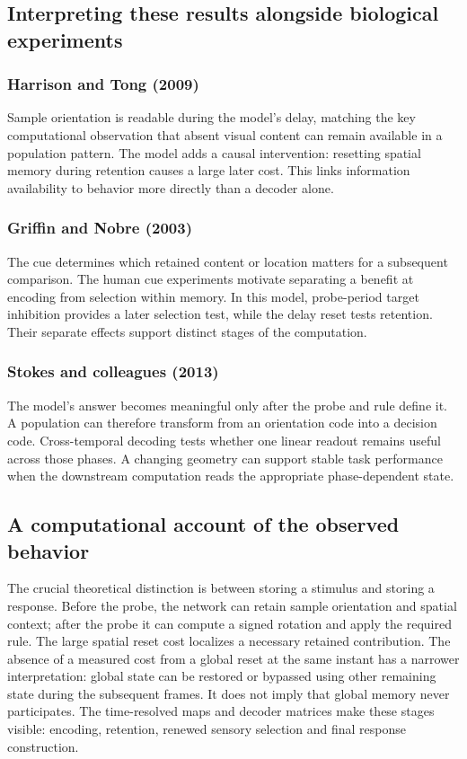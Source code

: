 \documentclass[11pt]{article}
\begin{document}
\subsection{Interpreting these results alongside biological experiments}
\subsubsection{Harrison and Tong (2009)}
Sample orientation is readable during the model’s delay, matching the key computational observation that absent visual content can remain available in a population pattern. The model adds a causal intervention: resetting spatial memory during retention causes a large later cost. This links information availability to behavior more directly than a decoder alone. \cite{bio_harrison}

\subsubsection{Griffin and Nobre (2003)}
The cue determines which retained content or location matters for a subsequent comparison. The human cue experiments motivate separating a benefit at encoding from selection within memory. In this model, probe-period target inhibition provides a later selection test, while the delay reset tests retention. Their separate effects support distinct stages of the computation. \cite{bio_griffin}

\subsubsection{Stokes and colleagues (2013)}
The model’s answer becomes meaningful only after the probe and rule define it. A population can therefore transform from an orientation code into a decision code. Cross-temporal decoding tests whether one linear readout remains useful across those phases. A changing geometry can support stable task performance when the downstream computation reads the appropriate phase-dependent state. \cite{bio_stokes}

\subsection{A computational account of the observed behavior}
The crucial theoretical distinction is between storing a stimulus and storing a response. Before the probe, the network can retain sample orientation and spatial context; after the probe it can compute a signed rotation and apply the required rule. The large spatial reset cost localizes a necessary retained contribution. The absence of a measured cost from a global reset at the same instant has a narrower interpretation: global state can be restored or bypassed using other remaining state during the subsequent frames. It does not imply that global memory never participates. The time-resolved maps and decoder matrices make these stages visible: encoding, retention, renewed sensory selection and final response construction.
\end{document}
